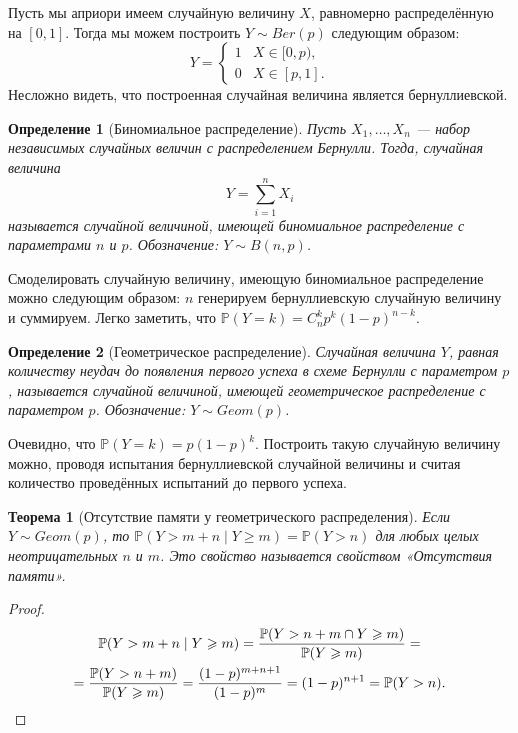 \documentclass[11pt]{article}
\newtheorem{theorem}{Теорема}
\newtheorem{definition}{Определение}
\begin{document}
Пусть мы априори имеем случайную величину $X$, равномерно распределённую на $[0, 1]$. Тогда мы можем построить $Y \sim Ber(p)$ следующим образом:
$$
Y = \begin{cases}
1 & X \in [0, p), \\
0 & X \in [p, 1].
\end{cases}
$$
Несложно видеть, что построенная случайная величина является бернуллиевской.

\begin{definition}[Биномиальное распределение]
Пусть $X_1, \ldots ,X_n$ — набор независимых случайных величин с распределением Бернулли. Тогда, случайная величина
$$
Y = \sum\limits_{i=1}^{n} X_i
$$
называется случайной величиной, имеющей биномиальное распределение с параметрами $n$ и $p$. Обозначение: $Y \sim B(n, p)$.
\end{definition}

Смоделировать случайную величину, имеющую биномиальное распределение можно следующим образом: $n$ генерируем бернуллиевскую случайную величину и суммируем. Легко заметить, что $\mathbb{P}(Y = k) = C_n^k p^k (1-p)^{n-k}$.

\begin{definition}[Геометрическое распределение]
Случайная величина $Y$, равная количеству неудач до появления первого успеха в схеме Бернулли с параметром $p$, называется случайной величиной, имеющей геометрическое распределение с параметром $p$. Обозначение: $Y \sim Geom(p)$.
\end{definition}

Очевидно, что $\mathbb{P}(Y = k) = p(1-p)^k$. Построить такую случайную величину можно, проводя испытания бернуллиевской случайной величины и считая количество проведённых испытаний до первого успеха.

\begin{theorem}[Отсутствие памяти у геометрического распределения] Если $Y \sim Geom(p)$, то $\mathbb{P}(Y > m + n \mid Y \geqslant m) = \mathbb{P}(Y > n)$ для любых целых неотрицательных $n$ и $m$. Это свойство называется свойством «Отсутствия памяти».
\end{theorem}
\begin{proof}
\begin{gather}
\mathbb{P}(Y > m + n \mid Y \geqslant m) = \frac{\mathbb{P}(Y > n + m \cap Y \geqslant m)}{\mathbb{P}(Y \geqslant m)} = \notag \\
= \frac{\mathbb{P}(Y > n+m)}{\mathbb{P}(Y \geqslant m)} = \frac{(1-p)^{m+n+1}}{(1-p)^m} = (1-p)^{n+1} = \mathbb{P}(Y>n). \notag
\end{gather}
\end{proof}
\end{document}
